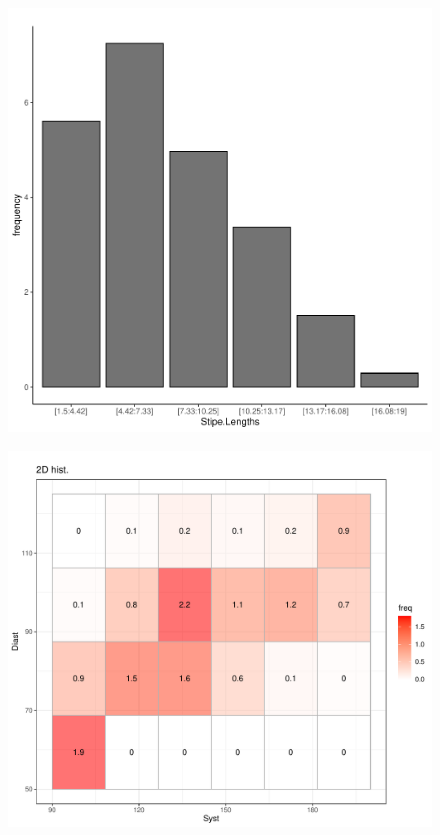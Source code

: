 \documentclass[article]{jss}
\begin{document}
\begin{appendix}
\begin{figure}[t!]
\centering
\includegraphics[width=1\textwidth]{pic/demo_book_hist} 
\caption{\label{fig:demo_book_hist}}
\end{figure}



\begin{figure}[t!]
\centering
\includegraphics[width=1\textwidth]{pic/demo_book_2dhist} 
\caption{\label{fig:demo_book_2dhist}}
\end{figure}




\end{appendix}
\end{document}
